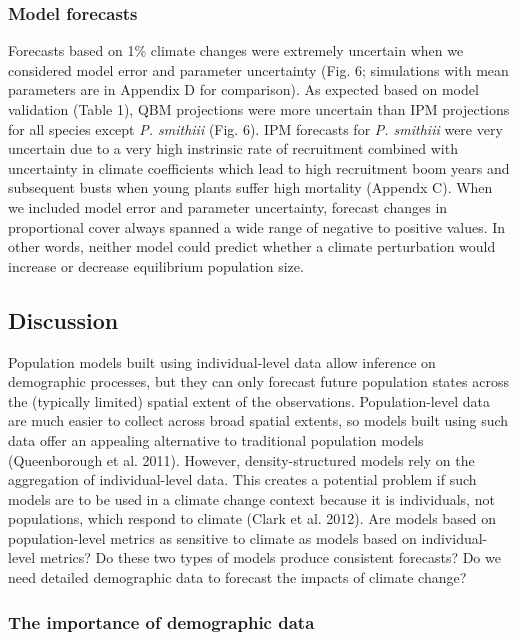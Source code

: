 \documentclass[12pt,]{article}
\begin{document}
\subsubsection{Model forecasts}\label{model-forecasts}

Forecasts based on 1\% climate changes were extremely uncertain when we
considered model error and parameter uncertainty (Fig. 6; simulations
with mean parameters are in Appendix D for comparison). As expected
based on model validation (Table 1), QBM projections were more uncertain
than IPM projections for all species except \emph{P. smithiii} (Fig. 6).
IPM forecasts for \emph{P. smithiii} were very uncertain due to a very
high instrinsic rate of recruitment combined with uncertainty in climate
coefficients which lead to high recruitment boom years and subsequent
busts when young plants suffer high mortality (Appendx C). When we
included model error and parameter uncertainty, forecast changes in
proportional cover always spanned a wide range of negative to positive
values. In other words, neither model could predict whether a climate
perturbation would increase or decrease equilibrium population size.

\subsection{Discussion}\label{discussion}

Population models built using individual-level data allow inference on
demographic processes, but they can only forecast future population
states across the (typically limited) spatial extent of the
observations. Population-level data are much easier to collect across
broad spatial extents, so models built using such data offer an
appealing alternative to traditional population models (Queenborough et
al. 2011). However, density-structured models rely on the aggregation of
individual-level data. This creates a potential problem if such models
are to be used in a climate change context because it is individuals,
not populations, which respond to climate (Clark et al. 2012). Are
models based on population-level metrics as sensitive to climate as
models based on individual-level metrics? Do these two types of models
produce consistent forecasts? Do we need detailed demographic data to
forecast the impacts of climate change?

\subsubsection{The importance of demographic
data}\label{the-importance-of-demographic-data}
\end{document}
